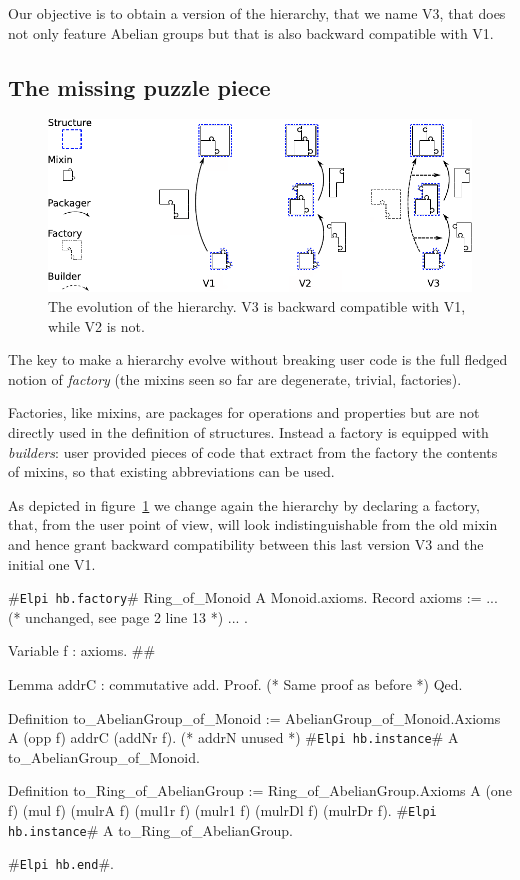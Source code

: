 \documentclass[a4paper,UKenglish,cleveref, autoref]{lipics-v2019}
\newcommand{\mixin}{mixin}
\newcommand{\mixins}{mixins}
\newcommand{\factory}{factory}
\newcommand{\factories}{factories}
\newcommand{\Factories}{Factories}
\newcommand{\phantterm}{abbreviation}
\newcommand{\builder}{builder}
\newcommand{\hbfactory}{{\tt\color{dkgreen}Elpi hb.factory}}
\newcommand{\hbinstance}{{\tt\color{dkgreen}Elpi hb.instance}}
\newcommand{\hbend}{{\tt\color{dkgreen}Elpi hb.end}}
\theoremstyle{implem}
\theoremstyle{implem}
\theoremstyle{command}
\begin{document}
Our objective is to obtain a version of the hierarchy, that we name V3, that does
not only feature Abelian groups but that is also backward compatible
with V1.

\subsection{The missing puzzle piece}\label{subsec:v3}

\begin{figure}[!h]
  \begin{center}
    \includegraphics[width=\textwidth]{puzzle.pdf}
  \end{center}
  \caption{\label{fig:puzzle}The evolution of the hierarchy. V3 is backward compatible with V1, while V2 is not.}
\end{figure}

The key to make a hierarchy evolve without breaking user code is the full
fledged notion of \emph{\factory{}} (the \mixins{} seen so far are degenerate,
trivial, \factories{}).

\Factories{}, like \mixins{}, are packages for operations and properties but are
not directly used in the definition of structures. Instead a \factory{} is
equipped with \emph{\builder{}s}: user provided pieces of code that extract
from the \factory{} the contents of \mixins{}, so that existing
\phantterm{}s can be used.

As depicted in figure~\ref{fig:puzzle} we change again the hierarchy
by declaring a  \factory{}, that, from the user point of view,
will look indistinguishable from the old  \mixin{}
and hence grant backward compatibility between this last version V3 and the
initial one V1.

\begin{coqcode}
#\hbfactory{}# Ring_of_Monoid A Monoid.axioms.
  Record axioms := { ... (* unchanged, see page 2 line 13 *) ... }.

  Variable f : axioms.                                                          #\label{demo3:variable:f}#

  Lemma addrC : commutative add.
  Proof. (* Same proof as before *) Qed.

  Definition to_AbelianGroup_of_Monoid :=
    AbelianGroup_of_Monoid.Axioms A (opp f) addrC (addNr f). (* addrN unused *)
  #\hbinstance{}# A to_AbelianGroup_of_Monoid.

  Definition to_Ring_of_AbelianGroup :=
    Ring_of_AbelianGroup.Axioms A (one f) (mul f)
      (mulrA f) (mul1r f) (mulr1 f) (mulrDl f) (mulrDr f).
  #\hbinstance{}# A to_Ring_of_AbelianGroup.

#\hbend{}#.
\end{coqcode}
\end{document}
